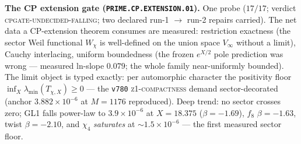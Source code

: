 \par\smallskip\noindent\textbf{The CP extension gate
(\texttt{PRIME.CP.EXTENSION.01}).}
One probe ($17/17$; verdict \textsc{cpgate-undecided-falling}; two
declared run-1 $\to$ run-2 repairs carried).  The net data a
CP-extension theorem consumes are measured: restriction exactness
(the sector Weil functional $W_{\chi}$ is well-defined on the union
space $V_{\infty}$ without a limit), Cauchy interlacing, uniform
boundedness (the frozen $e^{X/2}$ pole prediction was wrong ---
measured ln-slope $0.079$; the whole family near-uniformly bounded).
The limit object is typed exactly: per automorphic character the
positivity floor $\inf_X\lambda_{\min}(T_{\chi,X})\ge0$ --- the
\texttt{v780} \textsc{z1-compactness} demand sector-decorated
(anchor $3.882\times10^{-6}$ at $M=1176$ reproduced).  Deep trend:
no sector crosses zero; GL1 falls power-law to $3.9\times10^{-6}$ at
$X=18.375$ ($\beta=-1.69$), $f_8$ $\beta=-1.63$, twist
$\beta=-2.10$, and $\chi_4$ \emph{saturates} at
${\sim}1.5\times10^{-6}$ --- the first measured sector floor.
